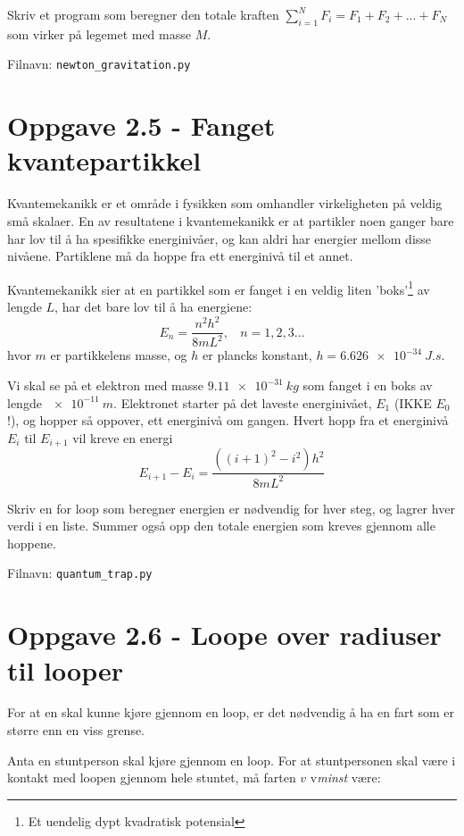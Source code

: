 \documentclass[10pt,a4paper]{article}
\newcommand{\planck}{$h = \SI{6.626e-34}{J.s}$}
\begin{document}
	
	Skriv et program som beregner den totale kraften $\sum_{i = 1}^N F_i = F_1 + F_2 + ... + F_N$ som virker på legemet med masse $M$. 
	
	Filnavn: \texttt{newton\_gravitation.py}
	
 
 
 
\section*{Oppgave 2.5 - Fanget kvantepartikkel}
Kvantemekanikk er et område i fysikken som omhandler virkeligheten på veldig små skalaer. En av resultatene i kvantemekanikk er at partikler noen ganger bare har lov til å ha spesifikke energinivåer, og kan aldri har energier mellom disse nivåene. Partiklene må da hoppe fra ett energinivå til et annet.
 
Kvantemekanikk sier at en partikkel som er fanget i en veldig liten 'boks'\footnote{Et uendelig dypt kvadratisk potensial} av lengde $L$, har det bare lov til å ha energiene:
\[	E_n = \frac{n^2h^2}{8mL^2}, \ \ \ \ n = 1,2,3\dots
\]
hvor $m$ er partikkelens masse, og $h$ er plancks konstant, \planck.
 
Vi skal se på et elektron med masse $\SI{9.11e-31}{kg}$ som fanget i en boks av lengde $\SI{e-11}{m}$. Elektronet starter på det laveste energinivået, $E_1$ (IKKE $E_0$!), og hopper så oppover, ett energinivå om gangen. Hvert hopp fra et energinivå $E_i$ til $E_{i+1}$ vil kreve en energi
\[  E_{i+1} - E_{i} = \frac{((i+1)^2-i^2)h^2}{8mL^2}
\]
 
Skriv en for loop som beregner energien er nødvendig for hver steg, og lagrer hver verdi i en liste. Summer også opp den totale energien som kreves gjennom alle hoppene.
 
Filnavn: \texttt{quantum\_trap.py}
 
 
 
\section*{Oppgave 2.6 - Loope over radiuser til looper}
For at en skal kunne kjøre gjennom en loop, er det nødvendig å ha en fart som er større enn en viss grense. 
 
Anta en stuntperson skal kjøre gjennom en loop. For at stuntpersonen skal være i kontakt med loopen gjennom hele stuntet, må farten $v$ v\textit{minst} være:
\end{document}
